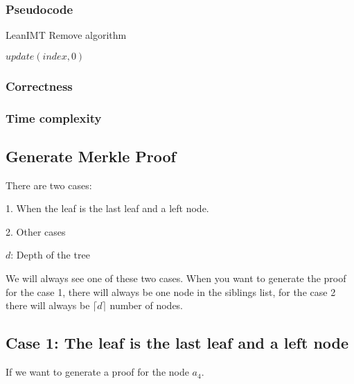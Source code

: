 \documentclass{article}
\begin{document}
\subsubsection{Pseudocode}

\begin{algorithm}[H]
    \caption{LeanIMT Remove algorithm}\label{remove}
    \begin{algorithmic}[1]
        \State $update(index, 0)$
        \EndProcedure
    \end{algorithmic}
\end{algorithm}



\subsubsection{Correctness}



\subsubsection{Time complexity}



\subsection{Generate Merkle Proof}

There are two cases:

1. When the leaf is the last leaf and a left node.

2. Other cases



$d$: Depth of the tree

We will always see one of these two cases. When you want to generate the proof for the case 1, there will always be one node in the siblings list, for the case 2 there will always be $\lceil d \rceil$ number of nodes.



\subsection*{Case 1: The leaf is the last leaf and a left node}



If we want to generate a proof for the node $a_4$.
\end{document}
